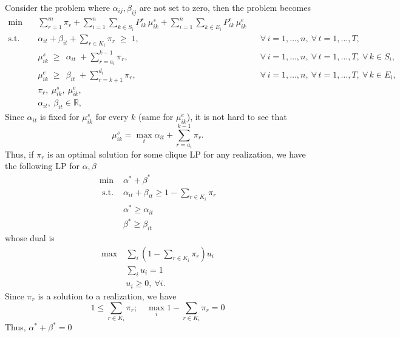 \documentclass{article}
\begin{document}
\newpage
Consider the problem where $\alpha_{ij},\beta_{ij}$ are not set to zero, then the problem becomes
\[
\begin{aligned}
\min\quad 
& \sum_{r=1}^{m} \pi_r
  + \sum_{i=1}^{n}\sum_{k\in S_i} P^s_{ik}\,\mu^s_{ik}
  + \sum_{i=1}^{n}\sum_{k\in E_i} P^e_{ik}\,\mu^e_{ik}\\[4pt]
\text{s.t.}\quad 
& \alpha_{it} + \beta_{it} + \sum_{r\in K_i} \pi_r \;\ge\; 1,
&& \forall\, i=1,\ldots,n,\ \forall\, t=1,\ldots,T, \\[4pt]
& \mu^s_{ik} \; \ge\; \,\alpha_{it} \;+\! \sum_{r=a_i}^{k-1} \pi_r,
&& \forall\, i=1,\ldots,n,\ \forall\, t=1,\ldots,T,\ \forall\, k\in S_i, \\[4pt]
& \mu^e_{ik} \;\ge\; \,\beta_{it} \;+\! \sum_{r=k+1}^{d_i} \pi_r,
&& \forall\, i=1,\ldots,n,\ \forall\, t=1,\ldots,T,\ \forall\, k\in E_i, \\[6pt]
& \pi_r,\ \mu^s_{ik},\ \mu^e_{ik},
&& \\[2pt]
& \alpha_{it},\ \beta_{it} \in \mathbb{R},
&& 
\end{aligned}
\]
Since $\alpha_{it}$ is fixed for $\mu_{ik}^{s}$ for every $k$ (same for $\mu^e_{ik}$), it is not hard to see that 
\[\mu_{ik}^{s} = \max_{t}\alpha_{it} + \sum_{r=a_i}^{k-1}\pi_r.\]
Thus, if $\pi_r$ is an optimal solution for some clique LP for any realization, we have the following LP for $\alpha,\beta$
\begin{align*}
    \min~&\alpha^*+\beta^*\\
    \text{ s.t. }&\alpha_{it}+\beta_{it}\geq 1-\sum_{r\in K_i}\pi_r\\
    &\alpha^*\geq \alpha_{it}\\
    &\beta^*\geq \beta_{it}
\end{align*}
whose dual is
\begin{align*}
    \max~&\sum_i \left(1-\sum_{r\in K_i}\pi_r\right)u_i\\
    &\sum_{i}u_i = 1\\
    &u_i\geq 0,~\forall i.
\end{align*}
Since $\pi_r$ is a solution to a realization, we have 
\[1\leq \sum_{r\in K_i}\pi_r;\quad \max_{i}1-\sum_{r\in K_i}\pi_r = 0\]
Thus, $\alpha^*+\beta^*=0$
\end{document}

